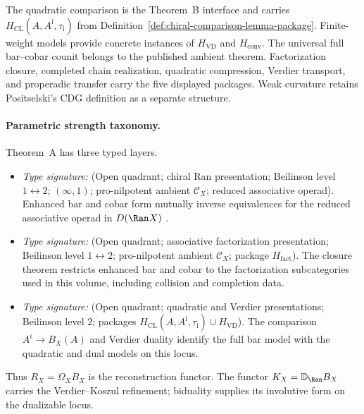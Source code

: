 The quadratic comparison is the Theorem~B interface and carries
$H_{\mathrm{CL}}(A,A^{\mathrm i},\tau_{\mathrm i})$ from
Definition~\ref{def:chiral-comparison-lemma-package}.  Finite-weight
models provide concrete instances of $H_{\mathrm{VD}}$ and
$H_{\mathrm{conv}}$.
The universal full bar--cobar counit belongs to the published ambient
theorem.  Factorization closure, completed chain realization,
quadratic compression, Verdier transport, and properadic transfer
carry the five displayed packages.  Weak curvature retains
Positselski's CDG definition as a separate structure.

\paragraph{Parametric strength taxonomy.}
\label{par:A-strength-taxonomy}%
%
Theorem~A has three typed layers.
\begin{itemize}
\item[\textsc{Ran reconstruction; $\ClaimStatusProvedElsewhere$.}]
\emph{Type signature:} (Open quadrant; chiral Ran presentation;
Beilinson level $1\leftrightarrow2$; $(\infty,1)$; pro-nilpotent
ambient $\mathcal C_X$; reduced associative operad).  Enhanced bar and cobar form mutually inverse
equivalences for the reduced associative operad in
$D(\Ran X)$ \cite[Proposition~4.1.2]{Francis2012}.
\item[\textsc{Factorization closure; $\ClaimStatusConjectured$.}]
\emph{Type signature:} (Open quadrant; associative factorization
presentation; Beilinson level $1\leftrightarrow2$; pro-nilpotent
ambient $\mathcal C_X$; package $H_{\mathrm{fact}}$).  The closure theorem
restricts enhanced bar and cobar to the factorization subcategories
used in this volume, including collision and completion data.
\item[\textsc{Theorem B interface and Verdier refinement;
$\ClaimStatusConditional$.}]
\emph{Type signature:} (Open quadrant; quadratic and Verdier
presentations; Beilinson level $2$; packages
$H_{\mathrm{CL}}(A,A^{\mathrm i},\tau_{\mathrm i})\cup H_{\mathrm{VD}}$).
The comparison
$A^i\to B_X(A)$ and Verdier duality identify the full bar model with
the quadratic and dual models on this locus.
\end{itemize}
Thus $R_X=\Omega_XB_X$ is the reconstruction functor.  The functor
$K_X=\mathbb D_{\Ran}B_X$ carries the Verdier--Koszul refinement;
biduality supplies its involutive form on the dualizable locus.

